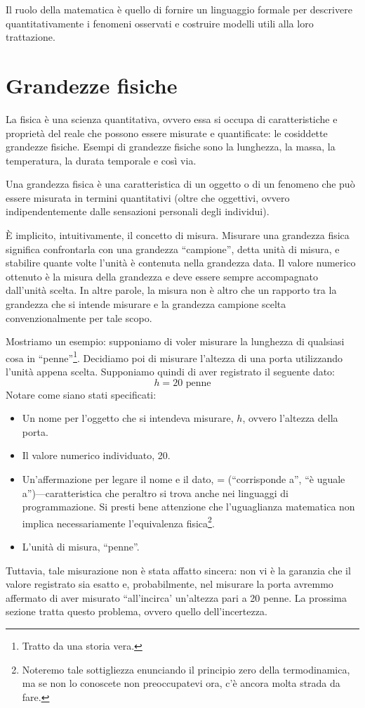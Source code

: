 Il ruolo della matematica è quello di fornire un linguaggio formale per descrivere
quantitativamente i fenomeni osservati e costruire modelli utili alla loro
trattazione.



\section{Grandezze fisiche}
La fisica è una scienza quantitativa, ovvero essa si occupa di caratteristiche
e proprietà del reale che possono essere misurate e quantificate: le cosiddette
grandezze fisiche. Esempi di grandezze fisiche sono la lunghezza, la massa, la
temperatura, la durata temporale e così via.

\begin{tcolorbox}[colback = yellow!30, colframe = yellow!30!black, title = {Grandezza fisica}]
Una grandezza fisica è una caratteristica di un oggetto o di un fenomeno che può
essere misurata in termini quantitativi (oltre che oggettivi, ovvero indipendentemente
dalle sensazioni personali degli individui).
\end{tcolorbox}

\noindent È implicito, intuitivamente, il concetto di misura. Misurare una grandezza
fisica significa confrontarla con una grandezza ``campione'', detta unità
di misura, e stabilire quante volte l'unità è contenuta nella
grandezza data. Il valore numerico ottenuto è la misura della grandezza e deve
essere sempre accompagnato dall'unità scelta.
In altre parole, la misura non è altro che un rapporto tra la
grandezza che si intende misurare e la grandezza campione scelta convenzionalmente
per tale scopo.

Mostriamo un esempio: supponiamo di voler misurare la lunghezza di qualsiasi cosa
in ``penne''\footnote{Tratto da una storia vera.}. Decidiamo poi di misurare l'altezza
di una porta utilizzando l'unità appena scelta. Supponiamo quindi di aver registrato il
seguente dato:
\[ h = 20 \text{ penne} \]
Notare come siano stati specificati:
\begin{itemize}
    \item Un nome per l'oggetto che si intendeva misurare, $h$, ovvero l'altezza
    della porta.
    \item Il valore numerico individuato, 20.
    \item Un'affermazione per legare il nome e il dato, = (``corrisponde a'', ``è
    uguale a'')—caratteristica che peraltro si trova anche nei linguaggi di
    programmazione. Si presti bene attenzione che l'uguaglianza matematica
    non implica necessariamente l'equivalenza fisica\footnote{Noteremo tale
    sottigliezza enunciando il principio zero della termodinamica, ma se non
    lo conoscete non preoccupatevi ora, c'è ancora molta strada da fare.}.
    \item L'unità di misura, ``penne''.
\end{itemize}
Tuttavia, tale misurazione non è stata affatto sincera: non vi è la
garanzia che il valore registrato sia esatto e, probabilmente, nel
misurare la porta avremmo affermato di aver misurato ``all'incirca'
un'altezza pari a 20 penne. La prossima sezione
tratta questo problema, ovvero quello dell'incertezza.

